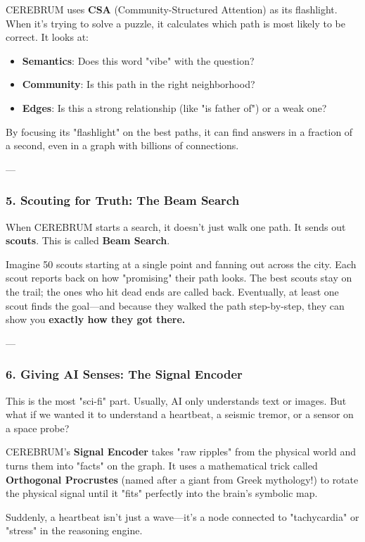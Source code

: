 \documentclass[10pt,journal,compsoc]{IEEEtran}
\begin{document}
CEREBRUM uses \textbf{CSA} (Community-Structured Attention) as its flashlight. When it’s trying to solve a puzzle, it calculates which path is most likely to be correct. It looks at:
\begin{itemize}
\item \textbf{Semantics}: Does this word "vibe" with the question?
\item \textbf{Community}: Is this path in the right neigh\-borhood?
\item \textbf{Edges}: Is this a strong relat\-ionship (like "is father of") or a weak one?

\end{itemize}
By focusing its "flashlight" on the best paths, it can find answers in a fraction of a second, even in a graph with billions of connections.

---

\subsubsection{\textbf{5. Scouting for Truth: The Beam Search}}
When CEREBRUM starts a search, it doesn't just walk one path. It sends out \textbf{scouts}. This is called \textbf{Beam Search}.

Imagine 50 scouts starting at a single point and fanning out across the city. Each scout reports back on how "promising" their path looks. The best scouts stay on the trail; the ones who hit dead ends are called back. Eventually, at least one scout finds the goal—and because they walked the path step-by-step, they can show you \textbf{exactly how they got there.}

---

\subsubsection{\textbf{6. Giving AI Senses: The Signal Encoder}}
This is the most "sci-fi" part. Usually, AI only understands text or images. But what if we wanted it to understand a heartbeat, a seismic tremor, or a sensor on a space probe?

CEREBRUM’s \textbf{Signal Encoder} takes "raw ripples" from the physical world and turns them into "facts" on the graph. It uses a mathe\-matical trick called \textbf{Orthogonal Procrustes} (named after a giant from Greek mythology!) to rotate the physical signal until it "fits" perfectly into the brain's symbolic map. 

Suddenly, a heartbeat isn't just a wave—it’s a node connected to "tachycardia" or "stress" in the reasoning engine.
\end{document}
